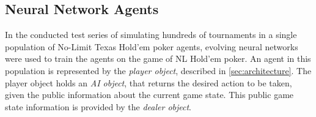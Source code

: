 \subsection{Neural Network Agents}
\label{subsec:nnagent}
In the conducted test series of simulating hundreds of tournaments in a single population of No-Limit Texas Hold'em poker agents, evolving neural networks were used to train the agents on the game of NL Hold'em poker. An agent in this population is represented by the \textit{player object}, described in \ref{sec:architecture}. The player object holds an \textit{AI object}, that returns the desired action to be taken, given the public information about the current game state. This public game state information is provided by the \textit{dealer object}.
